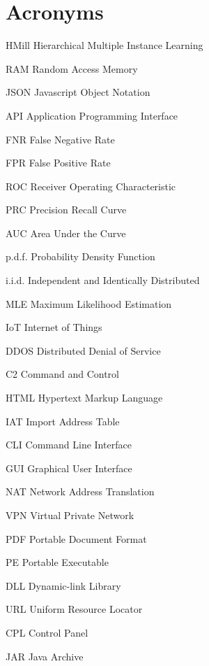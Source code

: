 \chapter*{Acronyms}
\begin{abbrv}
    \item[HMill]        Hierarchical Multiple Instance Learning
    \item[RAM]          Random Access Memory
    \item[JSON]         Javascript Object Notation
    \item[API]          Application Programming Interface
    \item[FNR]          False Negative Rate
    \item[FPR]          False Positive Rate
    \item[ROC]          Receiver Operating Characteristic
    \item[PRC]          Precision Recall Curve
    \item[AUC]          Area Under the Curve
    \item[p.d.f.]       Probability Density Function
    \item[i.i.d.]       Independent and Identically Distributed
    \item[MLE]          Maximum Likelihood Estimation
    \item[IoT]          Internet of Things
    \item[DDOS]         Distributed Denial of Service
    \item[C2]           Command and Control
    \item[HTML]         Hypertext Markup Language
    \item[IAT]          Import Address Table
    \item[CLI]          Command Line Interface
    \item[GUI]          Graphical User Interface
    \item[NAT]          Network Address Translation
    \item[VPN]          Virtual Private Network
    \item[PDF]          Portable Document Format
    \item[PE]           Portable Executable
    \item[DLL]          Dynamic-link Library
    \item[URL]          Uniform Resource Locator
    \item[CPL]          Control Panel        
    \item[JAR]          Java Archive

\end{abbrv}
